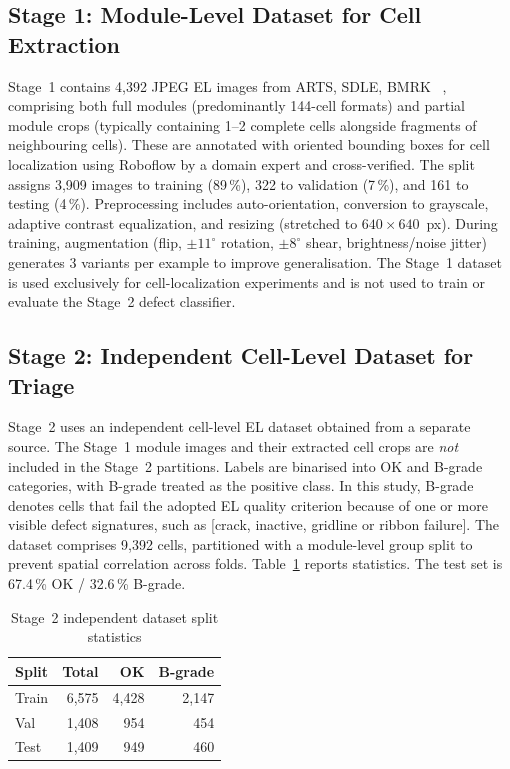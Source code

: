\documentclass[conference]{IEEEtran}
\begin{document}
\subsection{Stage 1: Module-Level Dataset for Cell Extraction}
Stage~1 contains 4{,}392 JPEG EL images from ARTS, SDLE, BMRK ~\cite{pratt2023benchmark}, comprising both full modules (predominantly 144-cell formats) and partial module crops (typically containing 1--2 complete cells alongside fragments of neighbouring cells). These are annotated with oriented bounding boxes for cell localization using Roboflow by a domain expert and cross-verified. The split assigns 3{,}909 images to training (89\,\%), 322 to validation (7\,\%), and 161 to testing (4\,\%). Preprocessing includes auto-orientation, conversion to grayscale, adaptive contrast equalization, and resizing (stretched to $640\times640$~px). During training, augmentation (flip, $\pm11^\circ$ rotation, $\pm8^\circ$ shear, brightness/noise jitter) generates 3 variants per example to improve generalisation. The Stage~1 dataset is used exclusively for cell-localization experiments and is not used to train or evaluate the Stage~2 defect classifier.

\subsection{Stage 2: Independent Cell-Level Dataset for Triage}
Stage~2 uses an independent cell-level EL dataset obtained from a separate source. The Stage~1 module images and their extracted cell crops are \textit{not} included in the Stage~2 partitions. Labels are binarised into OK and B-grade categories, with B-grade treated as the positive class. In this study, B-grade denotes cells that fail the adopted EL quality criterion because of one or more visible defect signatures, such as [crack, inactive, gridline or ribbon failure]. The dataset comprises 9{,}392 cells, partitioned with a module-level group split to prevent spatial correlation across folds. Table~\ref{tab:datasplit} reports statistics. The test set is 67.4\,\% OK / 32.6\,\% B-grade.

\begin{table}[t]
  \caption{Stage~2 independent dataset split statistics}
  \label{tab:datasplit}
  \begin{center}
  \renewcommand{\arraystretch}{1.05}\small
  \begin{tabular}{lrrr}
    \toprule
    \textbf{Split} & \textbf{Total} & \textbf{OK} & \textbf{B-grade}\\
    \midrule
    Train & 6{,}575 & 4{,}428 & 2{,}147\\
    Val   & 1{,}408 &   954   &   454\\
    Test  & 1{,}409 &   949   &   460\\
    \bottomrule
  \end{tabular}
  \end{center}
\end{table}
\end{document}
